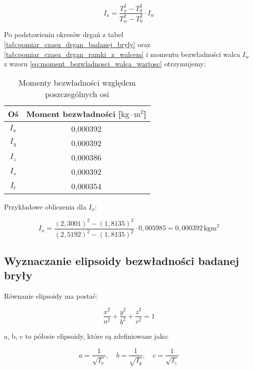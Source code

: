 \documentclass[a4paper,12pt]{article}
\begin{document}
\begin{equation} \label{eq:moment_bezwladnosci_badanej_bryly}
    I_x = \frac{T_x^2 - T_0^2}{T_w^2 - T_0^2} \cdot I_w
\end{equation}

Po podstawieniu okresów drgań z tabel \ref{tab:pomiar_czasu_drgan_badanej_bryly} oraz \ref{tab:pomiar_czasu_drgan_ramki_z_walcem} i momentu bezwładności walca $I_w$ z wzoru \eqref{eq:moment_bezwladnosci_walca_wartosc} otrzymujemy:

\begin{table}[H]
    \centering
    \begin{tabular}{|c|c|}
        \hline
        Oś & Moment bezwładności [$\text{kg}\cdot\text{m}^2$] \\
        \hline
        $I_x$ & 0,000392 \\
        $I_y$ & 0,000392 \\
        $I_z$ & 0,000386 \\
        $I_s$ & 0,000392 \\
        $I_t$ & 0,000354 \\
        \hline
    \end{tabular}
    \caption{Momenty bezwładności względem poszczególnych osi}
    \label{tab:momenty_bezwladnosci}
\end{table}

Przykładowe obliczenia dla $I_x$:

\begin{equation*}
    I_x = \frac{(2,3001)^2 - (1,8135)^2}{(2,5192)^2 - (1,8135)^2} \cdot 0,005985 = 0,000392\,\text{kgm}^2
\end{equation*}



\subsection{Wyznaczanie elipsoidy bezwładności badanej bryły}


Równanie elipsoidy ma postać:

\begin{equation} \label{eq:elipsoida_bezwladnosci}
    \frac{x^2}{a^2} + \frac{y^2}{b^2} + \frac{z^2}{c^2} = 1
\end{equation}

a, b, c to półosie elipsoidy, które są zdefiniowane jako:

\begin{equation*}
    a = \frac{1}{\sqrt{I_x}}, \quad
    b = \frac{1}{\sqrt{I_y}}, \quad
    c = \frac{1}{\sqrt{I_z}}
\end{equation*}
\end{document}
